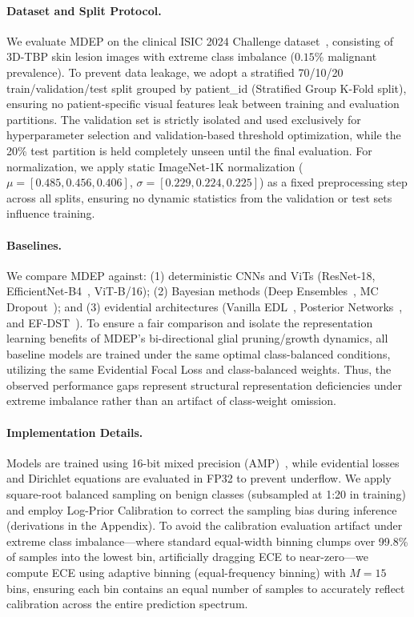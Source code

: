 \documentclass[letterpaper]{article} %
\begin{document}
\paragraph{Dataset and Split Protocol.} We evaluate MDEP on the clinical ISIC 2024 Challenge dataset~\cite{isic2024}, consisting of 3D-TBP skin lesion images with extreme class imbalance ($0.15\%$ malignant prevalence). To prevent data leakage, we adopt a stratified 70/10/20 train/validation/test split grouped by patient\_id (Stratified Group K-Fold split), ensuring no patient-specific visual features leak between training and evaluation partitions. The validation set is strictly isolated and used exclusively for hyperparameter selection and validation-based threshold optimization, while the 20\% test partition is held completely unseen until the final evaluation. For normalization, we apply static ImageNet-1K normalization ($\mu = [0.485, 0.456, 0.406]$, $\sigma = [0.229, 0.224, 0.225]$) as a fixed preprocessing step across all splits, ensuring no dynamic statistics from the validation or test sets influence training.

\paragraph{Baselines.} We compare MDEP against: (1) deterministic CNNs and ViTs (ResNet-18, EfficientNet-B4~\cite{tan2019efficientnet}, ViT-B/16); (2) Bayesian methods (Deep Ensembles~\cite{lakshminarayanan2017simple}, MC Dropout~\cite{gal2016dropout}); and (3) evidential architectures (Vanilla EDL~\cite{sensoy2018evidential}, Posterior Networks~\cite{charpentier2020posterior}, and EF-DST~\cite{sensoy2018evidential, evci2020rigging}). To ensure a fair comparison and isolate the representation learning benefits of MDEP's bi-directional glial pruning/growth dynamics, all baseline models are trained under the same optimal class-balanced conditions, utilizing the same Evidential Focal Loss and class-balanced weights. Thus, the observed performance gaps represent structural representation deficiencies under extreme imbalance rather than an artifact of class-weight omission.

\paragraph{Implementation Details.} Models are trained using 16-bit mixed precision (AMP)~\cite{micikevicius2018mixed}, while evidential losses and Dirichlet equations are evaluated in FP32 to prevent underflow. We apply square-root balanced sampling on benign classes (subsampled at 1:20 in training) and employ Log-Prior Calibration to correct the sampling bias during inference (derivations in the Appendix). To avoid the calibration evaluation artifact under extreme class imbalance—where standard equal-width binning clumps over 99.8\% of samples into the lowest bin, artificially dragging ECE to near-zero—we compute ECE using adaptive binning (equal-frequency binning) with $M=15$ bins, ensuring each bin contains an equal number of samples to accurately reflect calibration across the entire prediction spectrum.
\end{document}
